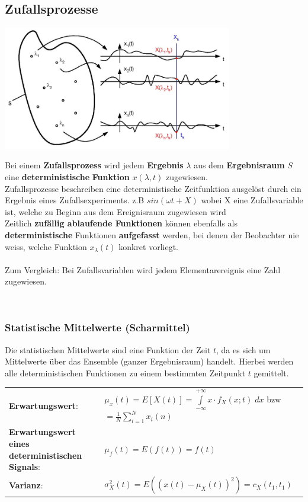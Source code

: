 \subsection{Zufallsprozesse}
\begin{minipage}{10.3cm}
	\includegraphics[width=10cm]{bilder/zufallsprozess.png}
\end{minipage}
\begin{minipage}{8.5cm}
	Bei einem \textbf{Zufallsprozess} wird jedem \textbf{Ergebnis} \boldmath$\lambda$ aus 
	dem \textbf{Ergebnisraum} $S$ eine \textbf{deterministische} \textbf{Funktion} $x(\lambda, t)$
	\unboldmath zugewiesen. \\
	Zufallsprozesse beschreiben eine deterministische Zeitfunktion ausgelöst durch ein Ergebnis eines
	Zufallsexperiments. z.B $sin(\omega t + X)$ wobei X eine Zufallsvariable ist, welche zu Beginn aus dem Ereignisraum zugewiesen wird\\
	Zeitlich \textbf{zufällig ablaufende Funktionen} können ebenfalls als \textbf{deterministische} Funktionen 
	\textbf{aufgefasst} werden, bei denen der Beobachter nie weiss, welche Funktion $x_\lambda(t)$ konkret
	vorliegt.	\\ \\
	Zum Vergleich: Bei Zufallsvariablen wird jedem Elementarereignis eine Zahl zugewiesen. 
\end{minipage} 
\vspace{0.5cm} \\

\subsubsection{Statistische Mittelwerte (Scharmittel)}
Die statistischen Mittelwerte sind eine Funktion der Zeit $t$, da es sich um Mittelwerte über das
Ensemble (ganzer Ergebnisraum) handelt. Hierbei werden alle deterministischen Funktionen zu einem
bestimmten Zeitpunkt $t$ gemittelt. 

\renewcommand{\arraystretch}{1.4}
\begin{tabular}[c]{ p{4.5cm}  p{13.5 cm}  }
	\textbf{Erwartungswert}: 	&  $\mu_{x}(t) = E\left[X(t)\right] =
          \int\limits_{-\infty}^{+\infty} x \cdot f_{X}(x;t)\;dx$ bzw $=\frac{1}{N}\sum\limits_{i=1}^{N}x_i(n)$ \\
    \textbf{Erwartungswert eines deterministischen Signals}:& $\mu_f(t) = E(f(t))=f(t)$\\
 	\textbf{Varianz}: &         $\sigma_X^2(t)=E((x(t)-\mu_X(t))^2)=c_X(t_1,t_1)$
    
	 
\end{tabular}
\renewcommand{\arraystretch}{1}



